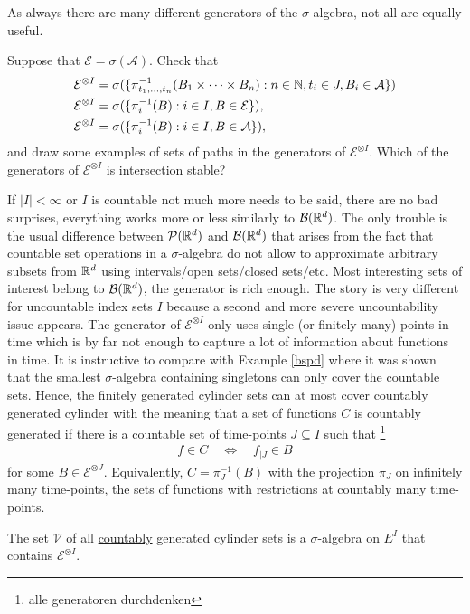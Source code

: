 As always there are many different generators of the $\sigma$-algebra, not all are equally useful.
\begin{luebung}
	Suppose that $\mathcal E=\sigma(\mathcal A)$. Check that 
	\begin{align*}
		\mathcal E^{\otimes I}&= \sigma( \{\pi^{-1}_{t_1,...,t_n}(B_1\times \cdots \times B_n):n\in\mathbb{N}, t_i\in J, B_i\in \mathcal A\})\\
		\mathcal E^{\otimes I}&= \sigma( \{\pi_i^{-1}(B):i \in I, B\in  \mathcal E \}),\\	
		\mathcal E^{\otimes I}&= \sigma( \{\pi_i^{-1}(B):i \in I, B\in  \mathcal A\}),
	\end{align*}
	and draw some examples of sets of paths in the generators of $\mathcal E^{\otimes I}$.	Which of the generators of $\mathcal E^{\otimes I}$ is intersection stable?
\end{luebung}
If $|I|<\infty$ or $I$ is countable not much more needs to be said, there are no bad surprises, everything works more or less similarly to $\mathcal B(\mathbb{R}^d)$. The only trouble is the usual difference between $\mathcal P(\mathbb{R}^d)$ and $\mathcal B(\mathbb{R}^d)$ that arises from the fact that countable set operations in a $\sigma$-algebra do not allow to approximate arbitrary subsets from $\mathbb{R}^d$ using intervals/open sets/closed sets/etc. Most interesting sets of interest belong to $\mathcal B(\mathbb{R}^d)$, the generator is rich enough. The story is very different for uncountable index sets $I$ because a second and more severe uncountability issue appears. The generator of $\mathcal E^{\otimes I}$ only uses single (or finitely many) points in time which is by far not enough to capture a lot of information about functions in time. It is instructive to compare with Example \ref{bspd} where it was shown that the smallest $\sigma$-algebra containing singletons can only cover the countable sets. Hence, the finitely generated cylinder sets can at most cover countably generated cylinder with the meaning that a set of functions $C$ is countably generated if there is a countable set of time-points $J\subseteq I$ 
such that  \footnote{alle generatoren durchdenken}
\begin{align*}
	f\in C\quad \Leftrightarrow \quad f_{|J}\in B
\end{align*}
for some $B\in \mathcal E^{\otimes J}$. Equivalently, $C=\pi^{-1}_J(B)$ with the projection $\pi_J$ on infinitely many time-points, the sets of functions with restrictions at countably many time-points.
\begin{llemma}
\begin{prop}
	The set $\mathcal V$ of all \underline{countably} generated cylinder sets is a $\sigma$-algebra on $E^I$ that contains $\mathcal E^{\otimes I}$.%
\end{prop}
\end{llemma}
